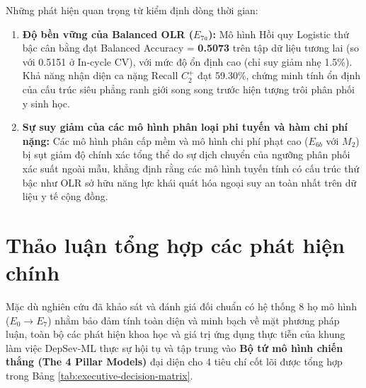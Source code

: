 Những phát hiện quan trọng từ kiểm định dòng thời gian:
\begin{enumerate}
    \item \textbf{Độ bền vững của Balanced OLR ($E_{7a}$):} Mô hình Hồi quy Logistic thứ bậc cân bằng đạt Balanced Accuracy = \textbf{0.5073} trên tập dữ liệu tương lai (so với 0.5151 ở In-cycle CV), với mức độ ổn định cao (chỉ suy giảm nhẹ 1.5\%). Khả năng nhận diện ca nặng Recall $C_2^+$ đạt 59.30\%, chứng minh tính ổn định của cấu trúc siêu phẳng ranh giới song song trước hiện tượng trôi phân phối y sinh học.
    \item \textbf{Sự suy giảm của các mô hình phân loại phi tuyến và hàm chi phí nặng:} Các mô hình phân cấp mềm và mô hình chi phí phạt cao ($E_{6b}$ với $M_2$) bị sụt giảm độ chính xác tổng thể do sự dịch chuyển của ngưỡng phân phối xác suất ngoài mẫu, khẳng định rằng các mô hình tuyến tính có cấu trúc thứ bậc như OLR sở hữu năng lực khái quát hóa ngoại suy an toàn nhất trên dữ liệu y tế cộng đồng.
\end{enumerate}

\section{Thảo luận tổng hợp các phát hiện chính}
\label{sec:thao-luan-tong-hop}

Mặc dù nghiên cứu đã khảo sát và đánh giá đối chuẩn có hệ thống 8 họ mô hình ($E_0 \to E_7$) nhằm bảo đảm tính toàn diện và minh bạch về mặt phương pháp luận, toàn bộ các phát hiện khoa học và giá trị ứng dụng thực tiễn của khung làm việc DepSev-ML thực sự hội tụ và tập trung vào \textbf{Bộ tứ mô hình chiến thắng (The 4 Pillar Models)} đại diện cho 4 tiêu chí cốt lõi được tổng hợp trong Bảng \ref{tab:executive-decision-matrix}.



